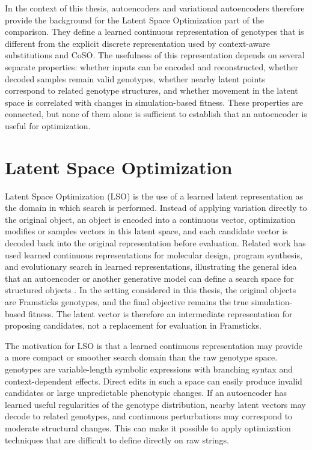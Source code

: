 In the context of this thesis, autoencoders and variational autoencoders therefore provide the background for the Latent Space Optimization part of the comparison. They define a learned continuous representation of \fone{} genotypes that is different from the explicit discrete representation used by context-aware substitutions and CoSO. The usefulness of this representation depends on several separate properties: whether inputs can be encoded and reconstructed, whether decoded samples remain valid genotypes, whether nearby latent points correspond to related genotype structures, and whether movement in the latent space is correlated with changes in simulation-based fitness. These properties are connected, but none of them alone is sufficient to establish that an autoencoder is useful for optimization.

\section{Latent Space Optimization}

Latent Space Optimization (LSO) is the use of a learned latent representation as the domain in which search is performed. Instead of applying variation directly to the original object, an object is encoded into a continuous vector, optimization modifies or samples vectors in this latent space, and each candidate vector is decoded back into the original representation before evaluation. Related work has used learned continuous representations for molecular design, program synthesis, and evolutionary search in learned representations, illustrating the general idea that an autoencoder or another generative model can define a search space for structured objects \cite{GomezBombarelli2018,KaszubaKomosinskiMensfelt2021,LiskowskiKrawiecTokluSwan2020,BentleyLimGaierTran2022}. In the setting considered in this thesis, the original objects are Framsticks \fone{} genotypes, and the final objective remains the true simulation-based \vertpos{} fitness. The latent vector is therefore an intermediate representation for proposing candidates, not a replacement for evaluation in Framsticks.

The motivation for LSO is that a learned continuous representation may provide a more compact or smoother search domain than the raw genotype space. \fone{} genotypes are variable-length symbolic expressions with branching syntax and context-dependent effects. Direct edits in such a space can easily produce invalid candidates or large unpredictable phenotypic changes. If an autoencoder has learned useful regularities of the genotype distribution, nearby latent vectors may decode to related genotypes, and continuous perturbations may correspond to moderate structural changes. This can make it possible to apply optimization techniques that are difficult to define directly on raw \fone{} strings.


